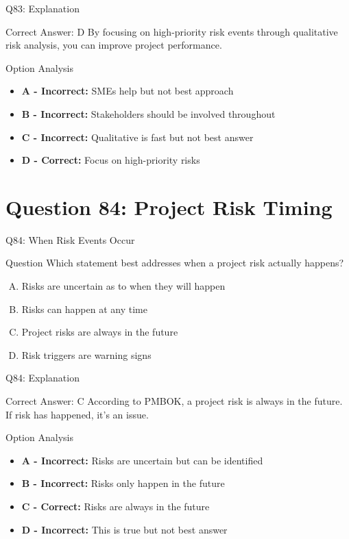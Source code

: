 \documentclass{beamer}
\begin{document}
	\begin{frame}{Q83: Explanation}
		\begin{block}{Correct Answer: D}
			By focusing on high-priority risk events through qualitative risk analysis, you can improve project performance.
		\end{block}
		\begin{block}{Option Analysis}
			\begin{itemize}
				\item \textbf{A - Incorrect:} SMEs help but not best approach
				\item \textbf{B - Incorrect:} Stakeholders should be involved throughout
				\item \textbf{C - Incorrect:} Qualitative is fast but not best answer
				\item \textbf{D - Correct:} Focus on high-priority risks
			\end{itemize}
		\end{block}
	\end{frame}
	
	\section{Question 84: Project Risk Timing}
	
	\begin{frame}{Q84: When Risk Events Occur}
		\begin{block}{Question}
			Which statement best addresses when a project risk actually happens?
		\end{block}
		\begin{enumerate}[(A)]
			\item Risks are uncertain as to when they will happen
			\item Risks can happen at any time
			\item Project risks are always in the future
			\item Risk triggers are warning signs
		\end{enumerate}
	\end{frame}
	
	\begin{frame}{Q84: Explanation}
		\begin{block}{Correct Answer: C}
			According to PMBOK, a project risk is always in the future. If risk has happened, it's an issue.
		\end{block}
		\begin{block}{Option Analysis}
			\begin{itemize}
				\item \textbf{A - Incorrect:} Risks are uncertain but can be identified
				\item \textbf{B - Incorrect:} Risks only happen in the future
				\item \textbf{C - Correct:} Risks are always in the future
				\item \textbf{D - Incorrect:} This is true but not best answer
			\end{itemize}
		\end{block}
	\end{frame}
	
\end{document}
